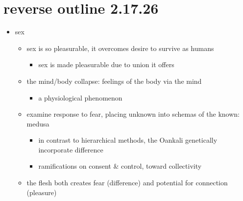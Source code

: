 \documentclass[11pt]{article}
\author{fcalado}
\date{\today}
\title{}
\begin{document}
\tableofcontents

\section{reverse outline 2.17.26}
\label{sec:org3b93ee7}

\begin{itemize}
\item sex
\begin{itemize}
\item sex is so pleasurable, it overcomes desire to survive as humans
\begin{itemize}
\item sex is made pleasurable due to union it offers
\end{itemize}
\item the mind/body collapse: feelings of the body via the mind
\begin{itemize}
\item a physiological phenomenon
\end{itemize}
\item examine response to fear, placing unknown into schemas of the
known: medusa
\begin{itemize}
\item in contrast to hierarchical methods, the Oankali genetically
incorporate difference
\item ramifications on consent \& control, toward collectivity
\end{itemize}
\item the flesh both creates fear (difference) and potential for
connection (pleasure)
\end{itemize}


\end{itemize}
\end{document}
